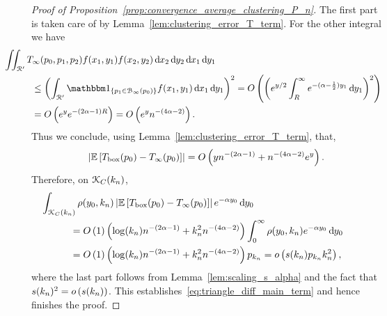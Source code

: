\begin{proof}[Proof of Proposition~\ref{prop:convergence_average_clustering_P_n}]
The first part is taken care of by Lemma~\ref{lem:clustering_error_T_term}. For the other integral we have
\begin{align*}
	&\hspace{-30pt}\iint_{\Rcal^\prime} T_{\infty}(p_0,p_1,p_2) f(x_1,y_1) f(x_2,y_2)
		\dd x_2 \dd y_2 \dd x_1 \dd y_1\\
	&\le \left(\int_{\Rcal^\prime} \ind{p_1 \in \BallPo{p_0}} f(x_1,y_1) \dd x_1 \dd y_1\right)^2
		= \bigO{\left(e^{y/2} \int_{R}^\infty e^{-(\alpha - \frac{1}{2})y_1} \dd y_1\right)^2}\\
	&= \bigO{e^{y} e^{-(2\alpha-1)R}} = \bigO{e^y n^{-(4\alpha - 2)}}.
\end{align*}
Thus we conclude, using Lemma~\ref{lem:clustering_error_T_term}, that,
\begin{equation}\label{eq:triangle_count_diff_scaling}
	\left|\mathbb{E}\left[T_{\text{box}}(p_0) - T_{\infty}(p_0)\right]\right| = O\left(y n^{-(2\alpha - 1)} + n^{-(4\alpha-2)} e^{y}\right).
\end{equation}
Therefore, on ${\mathcal K}_C(k_n)$, 
\begin{align*}
	&\hspace{-30pt}\int_{\Kcal_{C}(k_n)} \rho(y_0,k_n) \left|\Exp{T_{\text{box}}(p_0) - T_{\infty}(p_0)}\right| 
		e^{-\alpha y_0} \dd y_0\\
	&= \bigO{1} \left(\log(k_n) n^{-(2\alpha - 1)} + k_n^2 n^{-(4\alpha - 2)} \right) 
		\int_{0}^\infty \rho(y_0,k_n) e^{-\alpha y_0} \dd y_0\\
	&= \bigO{1} \left(\log(k_n) n^{-(2\alpha - 1)} + k_n^2 n^{-(4\alpha - 2)} \right) p_{k_n} = \smallO{s(k_n) p_{k_n} k_n^2},
\end{align*}
where the last part follows from Lemma~\ref{lem:scaling_s_alpha} and the fact that $s(k_n)^2 = o\left(s(k_n)\right)$. This establishes~\eqref{eq:triangle_diff_main_term} and hence finishes the proof.
%
\end{proof}

